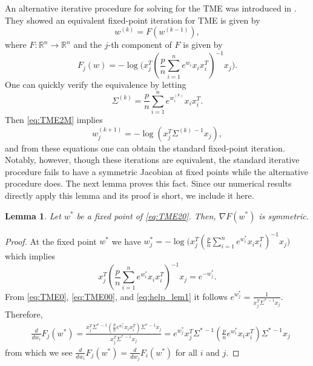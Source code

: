 \documentclass[11pt]{article}
\newtheorem{lemma}[theorem]{Lemma}
\newcommand{\R}{\mathbb{R}}
\begin{document}
An alternative iterative procedure for solving for the TME was introduced in \cite{DBLP:journals/ma/ZhangCS16}. They showed an equivalent fixed-point iteration for TME is given by 
\begin{equation}\label{eq:TME20}
w^{(k)}={F}(w^{(k-1)}),
\end{equation} 
where ${F}:\R^n\rightarrow\R^n$ and the $j$-th component of ${F}$ is given by 
\begin{equation}\label{eq:TME2M}
F_j(w)=-\log\Big(x_j^T(\frac{p}{n}\sum_{i=1}^ne^{w_i}x_i x_i^T)^{-1}x_j\Big).
\end{equation}
One can quickly verify the equivalence by letting 
\begin{equation}\label{eq:TME0}
\Sigma^{(k)}=\frac{p}{n}\sum_{i=1}^ne^{w_i^{(k)}}x_i x_i^T.
\end{equation}
Then \eqref{eq:TME2M} implies
\begin{equation}\label{eq:TME00}
w_j^{(k+1)}=-\log(x_j^T\Sigma^{(k)\,-1}x_j),
\end{equation}
and from these equations one can obtain the standard fixed-point iteration. Notably, however, though these iterations are equivalent, the standard iterative procedure fails to have a symmetric Jacobian at fixed points while the alternative procedure does. 
The next lemma proves this fact. Since our numerical results directly apply this lemma and its proof is short, we include it here.
\begin{lemma}
\label{lemma:tme_via_teng}
Let ${w}^*$  be a fixed point of \eqref{eq:TME20}. Then, $\nabla {F}(w^*)$ is symmetric.
\end{lemma}
\begin{proof}
At the fixed point $w^*$ we have
$
w_j^*=-\log\Big(x_j^T(\frac{p}{n}\sum_{i=1}^ne^{w_i^*}x_i x_i^T)^{-1}x_j\Big)
$
which implies
\begin{equation}\label{eq:help_lem1}
x_j^T\left(\frac{p}{n}\sum_{i=1}^ne^{w_i^*}x_i x_i^T\right)^{-1}x_j=e^{-w_j^*}.
\end{equation}
From \eqref{eq:TME0}, \eqref{eq:TME00}, and \eqref{eq:help_lem1} it follows
$
e^{w_j^*}=\frac{1}{x_j^T\Sigma^{*\,-1}x_j}. 
$
Therefore,
\begin{align*}
&\frac{d}{d w_i}F_j(w^*)=\frac{x_j^T\Sigma^{*\,-1}(\frac{p}{n}e^{w_i^*}x_i x_i^T)\Sigma^{*\,-1} x_j}{x_j^T\Sigma^{*\,-1}x_j}
={e^{w_j^*}x_j^T\Sigma^{*\,-1}\left(\frac{p}{n}e^{w_i^*}x_i x_i^T\right)\Sigma^{*\,-1}x_j}
\end{align*}
from which we see $\frac{d}{d w_i}F_j(w^*)=\frac{d}{d w_j}F_i(w^*)$ for all $i$ and $j$.
\end{proof}
\end{document}
